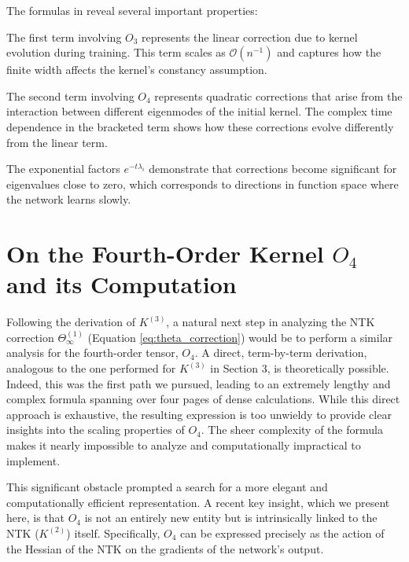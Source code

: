 \documentclass[a4paper]{article}
\begin{document}
\begin{remark}
The formulas in  reveal several important properties:

The first term involving $O_3$ represents the linear correction due to kernel evolution during training. This term scales as $\mathcal{O}(n^{-1})$ and captures how the finite width affects the kernel's constancy assumption.

The second term involving $O_4$ represents quadratic corrections that arise from the interaction between different eigenmodes of the initial kernel. The complex time dependence in the bracketed term shows how these corrections evolve differently from the linear term.

The exponential factors $e^{-t\lambda_i}$ demonstrate that corrections become significant for eigenvalues close to zero, which corresponds to directions in function space where the network learns slowly.
\end{remark}





\section{On the Fourth-Order Kernel $O_4$ and its Computation}

Following the derivation of $K^{(3)}$, a natural next step in analyzing the NTK correction $\Theta^{(1)}_\infty$ (Equation \ref{eq:theta_correction}) would be to perform a similar analysis for the fourth-order tensor, $O_4$. A direct, term-by-term derivation, analogous to the one performed for $K^{(3)}$ in Section 3, is theoretically possible. Indeed, this was the first path we pursued, leading to an extremely lengthy and complex formula spanning over four pages of dense calculations. While this direct approach is exhaustive, the resulting expression is too unwieldy to provide clear insights into the scaling properties of $O_4$. The sheer complexity of the formula makes it nearly impossible to analyze and computationally impractical to implement.

This significant obstacle prompted a search for a more elegant and computationally efficient representation. A recent key insight, which we present here, is that $O_4$ is not an entirely new entity but is intrinsically linked to the NTK ($K^{(2)}$) itself. Specifically, $O_4$ can be expressed precisely as the action of the Hessian of the NTK on the gradients of the network's output.
\end{document}
